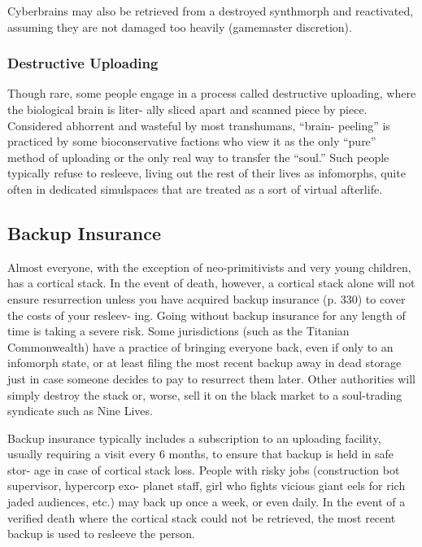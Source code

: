 Cyberbrains may also be retrieved from a destroyed 
synthmorph and reactivated, assuming they are not 
damaged too heavily (gamemaster discretion).

\subsubsection{Destructive Uploading}

Though rare, some people engage in a process called 
destructive uploading, where the biological brain is liter-
ally sliced apart and scanned piece by piece. Considered 
abhorrent and wasteful by most transhumans, ``brain-
peeling'' is practiced by some bioconservative factions 
who view it as the only ``pure'' method of uploading 
or the only real way to transfer the ``soul.'' Such people 
typically refuse to resleeve, living out the rest of their 
lives as infomorphs, quite often in dedicated simulspaces 
that are treated as a sort of virtual afterlife.

\subsection{Backup Insurance}

Almost everyone, with the exception of neo-primitivists 
and very young children, has a cortical stack. In the 
event of death, however, a cortical stack alone will not 
ensure resurrection unless you have acquired backup 
insurance (p. 330) to cover the costs of your resleev-
ing. Going without backup insurance for any length of 
time is taking a severe risk. Some jurisdictions (such 
as the Titanian Commonwealth) have a practice of 
bringing everyone back, even if only to an infomorph 
state, or at least filing the most recent backup away 
in dead storage just in case someone decides to pay 
to resurrect them later. Other authorities will simply 
destroy the stack or, worse, sell it on the black market 
to a soul-trading syndicate such as Nine Lives.

Backup insurance typically includes a subscription 
to an uploading facility, usually requiring a visit every 
6 months, to ensure that backup is held in safe stor-
age in case of cortical stack loss. People with risky 
jobs (construction bot supervisor, hypercorp exo-
planet staff, girl who fights vicious giant eels for rich 
jaded audiences, etc.) may back up once a week, or 
even daily. In the event of a verified death where the 
cortical stack could not be retrieved, the most recent 
backup is used to resleeve the person.

